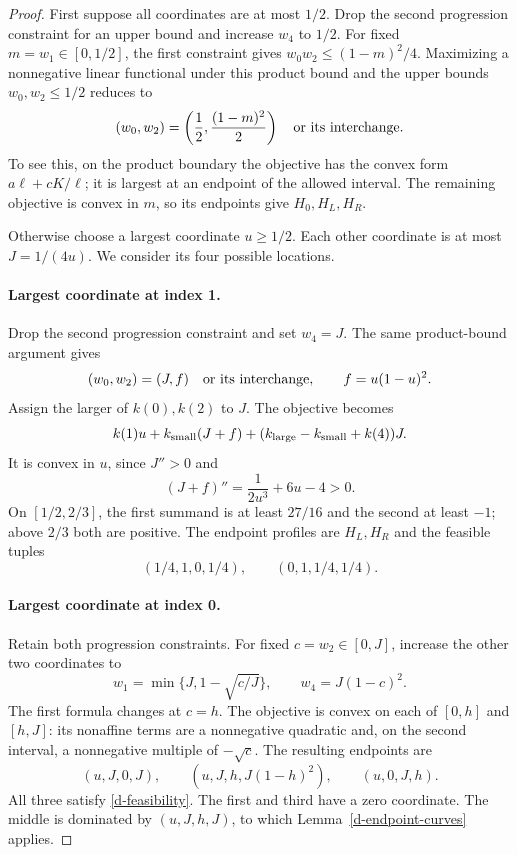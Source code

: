 \begin{proof}
First suppose all coordinates are at most $1/2$. Drop the second
progression constraint for an upper bound and increase $w_4$ to $1/2$.
For fixed $m=w_1\in[0,1/2]$, the first constraint gives
$w_0w_2\leq(1-m)^2/4$. Maximizing a nonnegative linear functional under
this product bound and the upper bounds $w_0,w_2\leq1/2$ reduces to
\[
(w_0,w_2)=\left(\frac12,\frac{(1-m)^2}{2}\right)
\quad\hbox{or its interchange}.
\]
To see this, on the product boundary the objective has the convex form
$a\ell+cK/\ell$; it is largest at an endpoint of the allowed interval.
The remaining objective is convex in $m$, so its endpoints give
$H_0,H_L,H_R$.

Otherwise choose a largest coordinate $u\geq1/2$. Each other coordinate
is at most $J=1/(4u)$. We consider its four possible locations.

\paragraph{Largest coordinate at index 1.}
Drop the second progression constraint and set $w_4=J$. The same
product-bound argument gives
\begin{equation}\label{d-middle-one}
(w_0,w_2)=(J,f)\quad\hbox{or its interchange},
\qquad f=u(1-u)^2.
\end{equation}
Assign the larger of $k(0),k(2)$ to $J$. The objective becomes
\[
k(1)u+k_{\rm small}(J+f)
+(k_{\rm large}-k_{\rm small}+k(4))J.
\]
It is convex in $u$, since $J''>0$ and
\[
(J+f)''=\frac1{2u^3}+6u-4>0.
\]
On $[1/2,2/3]$, the first summand is at least $27/16$ and the second
at least $-1$; above $2/3$ both are positive. The endpoint profiles are
$H_L,H_R$ and the feasible tuples
\[
(1/4,1,0,1/4),\qquad(0,1,1/4,1/4).
\]

\paragraph{Largest coordinate at index 0.}
Retain both progression constraints. For fixed $c=w_2\in[0,J]$, increase
the other two coordinates to
\begin{equation}\label{d-largest-zero-bounds}
w_1=\min\{J,1-\sqrt{c/J}\},\qquad w_4=J(1-c)^2.
\end{equation}
The first formula changes at $c=h$. The objective is convex on each of
$[0,h]$ and $[h,J]$: its nonaffine terms are a nonnegative quadratic
and, on the second interval, a nonnegative multiple of $-\sqrt c$.
The resulting endpoints are
\begin{equation}\label{d-largest-zero-profiles}
(u,J,0,J),\qquad
(u,J,h,J(1-h)^2),\qquad
(u,0,J,h).
\end{equation}
All three satisfy \eqref{d-feasibility}. The first and third have a zero
coordinate. The middle is dominated by $(u,J,h,J)$, to which
Lemma~\ref{d-endpoint-curves} applies.


\end{proof}
